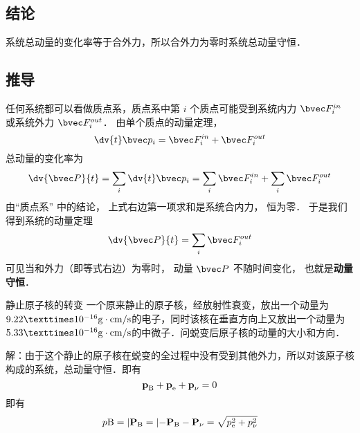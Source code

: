 \subsection{结论}
系统总动量的变化率等于合外力，所以合外力为零时系统总动量守恒．

\subsection{推导}
任何系统都可以看做质点系，质点系中第 $i$ 个质点可能受到系统内力 $\bvec F_i^{in}$ 或系统外力 $\bvec F_i^{out}$． 由单个质点的动量定理，
\begin{equation}
\dv{t} \bvec p_i = \bvec F_i^{in} + \bvec F_i^{out}
\end{equation}
总动量的变化率为
\begin{equation}
\dv{\bvec P}{t} = \sum_i \dv{t} \bvec p_i  = \sum_i \bvec F_i^{in}  + \sum_i \bvec F_i^{out}
\end{equation}
由“质点系” 中的结论， 上式右边第一项求和是系统合内力， 恒为零． 于是我们得到系统的动量定理
\begin{equation}
\dv{\bvec P}{t} = \sum_i \bvec F_i^{out}
\end{equation}
可见当和外力（即等式右边）为零时， 动量 $\bvec P$ 不随时间变化， 也就是\textbf{动量守恒}．

\begin{example}{静止原子核的转变}
一个原来静止的原子核，经放射性衰变，放出一个动量为$9.22×10^{-16}{\rm g\cdot cm/s}$的电子，同时该核在垂直方向上又放出一个动量为$5.33×10^{-16}{\rm g\cdot cm/s}$的中微子．问蜕变后原子核的动量的大小和方向．

解：由于这个静止的原子核在蜕变的全过程中没有受到其他外力，所以对该原子核构成的系统，总动量守恒．即有
$$\textbf{p}_{\rm B}+\textbf{p}_{\rm e}+\textbf{p}_{\rm \nu}=0$$
即有
$$p{\rm B}=\vert{\textbf{P}_{\rm B}}=\vert{-\textbf{P}_{\rm B}-\textbf{P}_{\rm \nu}}=\sqrt{p_{\rm e}^{2}+p_{\rm \nu}^{2}}$$
\end{example}
